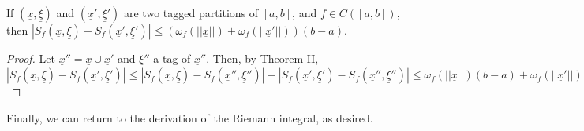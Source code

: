 \begin{theorem}
    If $(\underline{x}, \underline{\xi})$ and $(\underline{x}', \underline{\xi}')$ are two tagged partitions of $[a,b]$, and $f \in C([a,b])$, then $|S_f(\underline{x}, \underline{\xi}) - S_f(\underline{x}', \underline{\xi}')| \leq (\omega_f(||\underline{x}||) + \omega_f(||\underline{x}'||))(b-a)$.
\end{theorem}

\begin{proof}
    Let $\underline{x}'' = \underline{x} \cup \underline{x}'$ and $\underline{\xi}''$ a tag of $\underline{x}''$. Then, by Theorem II, $|S_f(\underline{x}, \underline{\xi}) - S_f(\underline{x}', \underline{\xi}')| \leq |S_f(\underline{x}, \underline{\xi}) - S_f(\underline{x}'', \underline{\xi}'')| - |S_f(\underline{x}', \underline{\xi}') - S_f(\underline{x}'', \underline{\xi}'')| \leq \omega_f(||\underline{x}||)(b-a) + \omega_f(||\underline{x}'||)(b-a)$
\end{proof}

Finally, we can return to the derivation of the Riemann integral, as desired.

